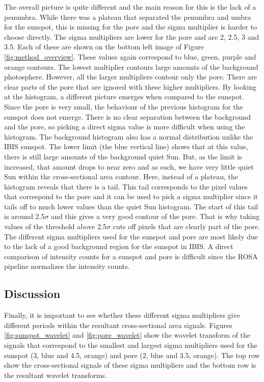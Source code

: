     The overall picture is quite different and the main reason for this is the lack of a penumbra.
    While there was a plateau that separated the penumbra and umbra for the sunspot, this is missing for the pore and the sigma multiplier is harder to choose directly.
    The sigma multipliers are lower for the pore and are 2, 2.5, 3 and 3.5.
    Each of these are shown on the bottom left image of Figure \ref{fig:method_overview}.
    These values again correspond to blue, green, purple and orange contours.
    The lowest multiplier contours large amounts of the background photosphere.
    However, all the larger multipliers contour only the pore.
    There are clear parts of the pore that are ignored with these higher multipliers.
    By looking at the histogram, a different picture emerges when compared to the sunspot.
    Since the pore is very small, the behaviour of the previous histogram for the sunspot does not emerge.
    There is no clear separation between the background and the pore, so picking a direct sigma value is more difficult when using the histogram.
    The background histogram also has a normal distribution unlike the IBIS sunspot.
    The lower limit (the blue vertical line) shows that at this value, there is still large amounts of the background quiet Sun.
    But, as the limit is increased, that amount drops to near zero and as such, we have very little quiet Sun within the cross-sectional area contour.
    Here, instead of a plateau, the histogram reveals that there is a tail.
    This tail corresponds to the pixel values that correspond to the pore and it can be used to pick a sigma multiplier since it tails off to much lower values than the quiet Sun histogram.
    The start of this tail is around 2.5$\sigma$ and this gives a very good contour of the pore.
    That is why taking values of the threshold above 2.5$\sigma$ cuts off pixels that are clearly part of the pore.
    The different sigma multipliers used for the sunspot and pore are most likely due to the lack of a good background region for the sunspot in IBIS.
    A direct comparison of intensity counts for a sunspot and pore is difficult since the ROSA pipeline normalizes the intensity counts.
    
    \subsection{Discussion}
    
    Finally, it is important to see whether these different sigma multipliers give different periods within the resultant cross-sectional area signals.
    Figures \ref{fig:sunspot_wavelet} and \ref{fig:pore_wavelet} show the wavelet transform of the signals that correspond to the smallest and largest sigma multipliers used for the sunspot (3, blue and 4.5, orange) and pore (2, blue and 3.5, orange).
    The top row show the cross-sectional signals of these sigma multipliers and the bottom row is the resultant wavelet transforms.

